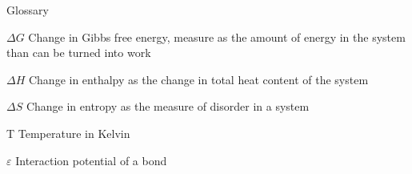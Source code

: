 
\begin{dictionary}{Glossary}
\item[$\Delta G$] Change in Gibbs free energy, measure as the amount of energy in the system than can be turned into work
\item[$\Delta H$] Change in enthalpy as the change in total heat content of the system
\item[$\Delta S$] Change in entropy as the measure of disorder in a system
\item[T] Temperature in Kelvin
\item[$\varepsilon$] Interaction potential of a bond 
\end{dictionary}
